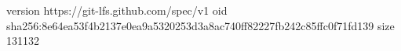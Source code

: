 version https://git-lfs.github.com/spec/v1
oid sha256:8e64ea53f4b2137e0ea9a5320253d3a8ac740ff82227fb242c85ffc0f71fd139
size 131132
